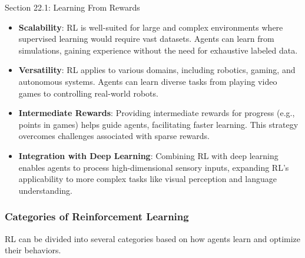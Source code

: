 \begin{notes}{Section 22.1: Learning From Rewards}
    \begin{highlight}
    
        \begin{itemize}
            \item \textbf{Scalability}: RL is well-suited for large and complex environments where supervised learning would require vast datasets. Agents can learn from simulations, gaining experience 
            without the need for exhaustive labeled data.
            \item \textbf{Versatility}: RL applies to various domains, including robotics, gaming, and autonomous systems. Agents can learn diverse tasks from playing video games to controlling real-world 
            robots.
            \item \textbf{Intermediate Rewards}: Providing intermediate rewards for progress (e.g., points in games) helps guide agents, facilitating faster learning. This strategy overcomes challenges 
            associated with sparse rewards.
            \item \textbf{Integration with Deep Learning}: Combining RL with deep learning enables agents to process high-dimensional sensory inputs, expanding RL's applicability to more complex tasks 
            like visual perception and language understanding.
        \end{itemize}
    
    \end{highlight}
    
    \subsubsection*{Categories of Reinforcement Learning}
    
    RL can be divided into several categories based on how agents learn and optimize their behaviors.
    
    \begin{highlight}
    

\end{highlight}
\end{notes}
